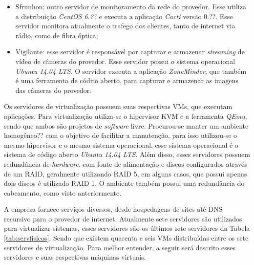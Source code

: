 \begin{itemize}
 \item Sfrunhon: outro servidor de monitoramento da rede do provedor. Esse utiliza a distribuição \textit{CentOS 6.??} e executa a aplicação
 \textit{Cacti} versão 0.??. Esse servidor monitora atualmente o trafego dos clientes, tanto de internet via rádio, como de fibra óptica;
 
 \item Vigilante: esse servidor é responsável por capturar e armazenar \textit{streaming} de vídeo de câmeras do provedor. Esse servidor possui
 o sistema operacional \textit{Ubuntu 14.04 \ac{LTS}}. O servidor executa a aplicação \textit{ZoneMinder}, que também é uma ferramenta de códito 
 aberto, para capturar e armazenar as imagens das câmeras do provedor.
\end{itemize}


Os servidores de virtualização possuem suas respectivas \ac{VM}s, que executam aplicações. Para virtualização utiliza-se o hipervisor 
\ac{KVM} e a ferramenta \textit{QEmu}, sendo que ambos são projetos de \textit{software} livre. Procurou-se manter um ambiente homogêneo?? 
com o objetivo de facilitar a manutenção, para isso utilizou-se o mesmo hipervisor e o mesmo sistema operacional, esse sistema operacional é
o sistema de código aberto \textit{Ubuntu 14.04 \ac{LTS}}.
Além disso, esses servidores possuem redundância de \textit{hardware}, com fonte de alimentação e discos configurados através de um \ac{RAID}, 
geralmente utilizando \ac{RAID} 5, em alguns casos, que possui apenas dois discos é utilizado \ac{RAID} 1. O ambiente também possui uma 
redundância do cabeamento, como visto anteriormente.

A empresa fornece serviços diversos, desde hospedagens de sites até \ac{DNS} recursivo para o provedor de internet. Atualmente sete servidores 
são utilizados para virtualizar sistemas, esses servidores são os últimos sete servidores da Tabela \ref{tab:servfisicos}.
Sendo que existem quarenta e seis \ac{VM}s distribuídas entre os sete servidores de virtualização.
Para melhor entender, a seguir será descrito esses servidores e suas respectivas máquinas virtuais.

